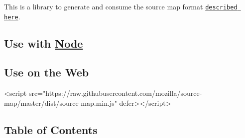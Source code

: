 \href{https://travis-ci.org/mozilla/source-map}{\tt }

\href{https://www.npmjs.com/package/source-map}{\tt }

This is a library to generate and consume the source map format \href{https://docs.google.com/document/d/1U1RGAehQwRypUTovF1KRlpiOFze0b-_2gc6fAH0KY0k/edit}{\tt described here}.

\subsection*{Use with \mbox{\hyperlink{classNode}{Node}}}



\subsection*{Use on the Web}

\begin{DoxyVerb}<script src="https://raw.githubusercontent.com/mozilla/source-map/master/dist/source-map.min.js" defer></script>
\end{DoxyVerb}






\subsection*{Table of Contents}


